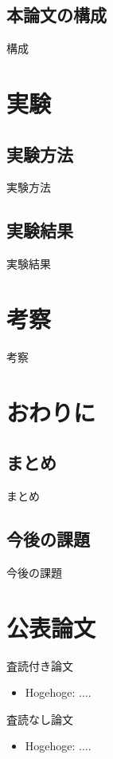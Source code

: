 \documentclass[12pt,epsf,dvipdfmx]{jreport}
\begin{document}
 \section{本論文の構成}
 構成



\chapter{実験}
 \section{実験方法}
 実験方法

 \section{実験結果}
 実験結果



\chapter{考察}
考察

\chapter{おわりに}
 \section{まとめ}
 まとめ

 \section{今後の課題}
 今後の課題


\chapter*{公表論文}

\begin{list}%
 {} %
 {} %
 \item 査読付き論文
       \begin{itemize}
	\item Hogehoge: ....
       \end{itemize}
 \item 査読なし論文
       \begin{itemize}
	\item Hogehoge: ....
       \end{itemize}
\end{list}
\end{document}
